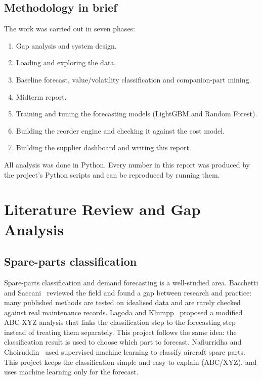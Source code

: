 \documentclass[12pt,oneside]{report}
\begin{document}
\section{Methodology in brief}
The work was carried out in seven phases:
\begin{enumerate}
\item Gap analysis and system design.
\item Loading and exploring the data.
\item Baseline forecast, value/volatility classification and companion-part mining.
\item Midterm report.
\item Training and tuning the forecasting models (LightGBM and Random Forest).
\item Building the reorder engine and checking it against the cost model.
\item Building the supplier dashboard and writing this report.
\end{enumerate}
All analysis was done in Python. Every number in this report was produced by the project's Python scripts and can be reproduced by running them.

\chapter{Literature Review and Gap Analysis}
\label{ch:lit}

\section{Spare-parts classification}
Spare-parts classification and demand forecasting is a well-studied area. Bacchetti and Saccani~\cite{bacchetti2012} reviewed the field and found a gap between research and practice: many published methods are tested on idealised data and are rarely checked against real maintenance records. Lagoda and Klumpp~\cite{lagoda2024} proposed a modified ABC-XYZ analysis that links the classification step to the forecasting step instead of treating them separately. This project follows the same idea: the classification result is used to choose which part to forecast. Nafiurridha and Choiruddin~\cite{nafiurridha2024} used supervised machine learning to classify aircraft spare parts. This project keeps the classification simple and easy to explain (ABC/XYZ), and uses machine learning only for the forecast.
\end{document}

